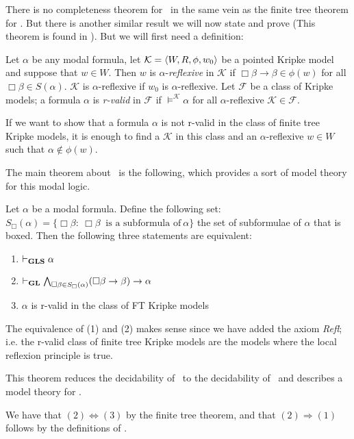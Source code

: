 \documentclass[../main.tex]{subfiles}
\begin{document}
There is no completeness theorem for \GLS\ in the same vein as the finite tree
theorem for \GL. But there is another similar result we will now state and
prove (This theorem is found in \citet{Lind1997}). But we will first need a
definition:
\begin{defi}
	Let $\alpha$ be any modal formula, let $\mathcal{K}=\langle
W,R,\phi,w_0\rangle$ be a pointed Kripke model and suppose that $w\in W$.
Then $w$ is $\alpha$-\textit{reflexive} in $\mathcal{K}$ if
$\Box\beta\rightarrow\beta\in\phi(w)$ for all $\Box\beta\in S(\alpha)$.
$\mathcal{K}$ is $\alpha$-reflexive if $w_0$ is $\alpha$-reflexive. Let
$\mathcal{F}$ be a class of Kripke models; a formula $\alpha$ is
\textit{r-valid} in $\mathcal{F}$ if $\vDash^\mathcal{K}\alpha$ for all
$\alpha$-reflexive $\mathcal{K}\in\mathcal{F}$.
\end{defi}

If we want to show that a formula $\alpha$ is not r-valid in the class of
finite tree Kripke models, it is enough to find a $\mathcal{K}$ in this class
and an $\alpha$-reflexive $w\in W$ such that $\alpha\not\in\phi(w)$.

The main theorem about \GLS\ is the following, which provides a sort of
model theory for this modal logic. 

\begin{thm}
	\label{thm:MainGLS}
	Let $\alpha$ be a modal formula. Define the following set: $S_\Box(\alpha)=\{\Box\beta:\
	\Box\beta\ \text{ is a subformula of}\ \alpha\}$ the set of
	subformulae of $\alpha$ that is boxed. Then the following three
	statements are equivalent:
	\begin{enumerate}
		\item $\vdash_{\text{\textbf{GLS}}}\alpha$
		\item $\vdash_{\text{\textbf{GL}}}\bigwedge_{\Box\beta\in
			S_\Box(\alpha)}(\Box\beta\rightarrow\beta)\rightarrow\alpha$
		\item $\alpha$ is r-valid in the class of FT Kripke
			models
	\end{enumerate}
\end{thm}
The equivalence of (1) and (2) makes sense since we have added the axiom
\textit{Refl}; i.e.
the r-valid class of finite tree Kripke models are the models where the local
reflexion principle is true.

This theorem reduces the decidability of \GLS\ to the decidability of \GL\ and
describes a model theory for \GLS.

	We have that $(2)\Leftrightarrow(3)$ by the finite tree theorem, and
	that $(2)\Rightarrow(1)$  follows by the definitions of \GLS.
\end{document}
